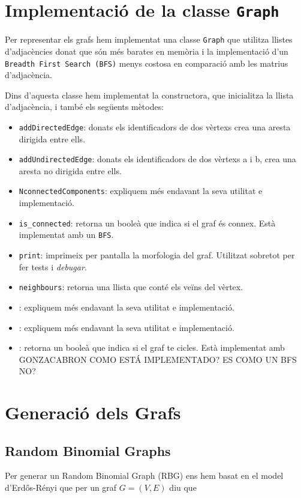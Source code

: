 \section{Implementació de la classe \texttt{Graph}}
Per representar els grafs hem implementat una classe \texttt{Graph} que utilitza llistes d'adjacències donat que són més barates en memòria i la implementació d'un \texttt{Breadth First Search (BFS)} menys costosa en comparació amb les matrius d'adjacència.

Dins d'aquesta classe hem implementat la constructora, que inicialitza la llista d'adjacència, i també els següents mètodes:
\begin{itemize}
    \item\texttt{addDirectedEdge}: donats els identificadors de dos vèrtexs crea una aresta dirigida entre ells.
    \item\texttt{addUndirectedEdge}: donats els identificadors de dos vèrtexs a i b, crea una aresta no dirigida entre ells.
    \item\texttt{NconnectedComponents}: expliquem més endavant la seva utilitat e implementació.
    \item\texttt{is\_connected}: retorna un booleà que indica si el graf és connex. Està implementat amb un \texttt{BFS}.
    \item\texttt{print}: imprimeix per pantalla la morfologia del graf. Utilitzat sobretot per fer tests i \textit{debugar}.
    \item\texttt{neighbours}: retorna una llista que conté els veïns del vèrtex.
    \item{}: expliquem més endavant la seva utilitat e implementació.
    \item{}: expliquem més endavant la seva utilitat e implementació.
    \item{}: retorna un booleà que indica si el graf te cicles. Està implementat amb GONZACABRON COMO ESTÁ IMPLEMENTADO? ES COMO UN BFS NO?
\end{itemize}

\section{Generació dels Grafs}
\subsection{Random Binomial Graphs}
Per generar un Random Binomial Graph (RBG) ens hem basat en el model d'Erdős-Rényi \cite{Erdos1960OnGraphs,Erdos1959OnI} que per un graf $G=(V,E)$ diu que

